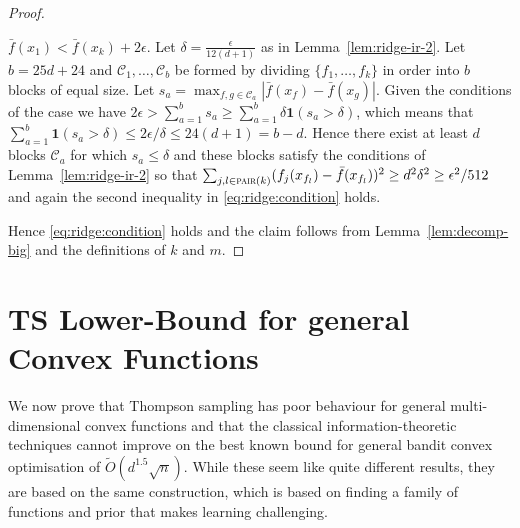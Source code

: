 \documentclass[letter, 12pt]{report}
\newcommand{\pair}{\operatorname{\textsc{pair}}}
\newcommand{\cC}{\mathcal C}
\newcommand{\sind}{\bm{1}}
\newcommand{\1}{\mathbf{1}}
\newcommand{\ts}{\textsc{TS}\xspace}
\theoremstyle{plain}
\theoremstyle{definition}
\theoremstyle{remark}
\begin{document}
\begin{proof}
\begin{enumcases}
        \item $\bar f(x_1) < \bar f(x_k) + 2\epsilon$. Let $\delta = \frac{\epsilon}{12(d+1)}$ as in Lemma~\ref{lem:ridge-ir-2}.
        Let $b = 25d + 24$ and $\cC_1,\ldots,\cC_b$ be formed by dividing $\{f_1,\ldots,f_k\}$ in order into $b$ blocks of equal size.
        Let $s_a = \max_{f,g \in \cC_a} |\bar f(x_f) - \bar f(x_g)|$.
        Given the conditions of the case we have $2\epsilon > \sum_{a=1}^b s_a \geq \sum_{a=1}^b \delta \sind(s_a > \delta)$,
        which means that $\sum_{a=1}^b \sind(s_a > \delta) \leq 2\epsilon / \delta \leq 24(d+1) = b - d$.
        Hence there exist at least $d$ blocks $\cC_a$ for which $s_a \leq \delta$ and these blocks satisfy the conditions of Lemma~\ref{lem:ridge-ir-2} so that
        $\sum_{j,l \in \pair(k)} (f_j(x_{f_l}) - \bar f(x_{f_l}))^2 \geq d^2 \delta^2 \geq \epsilon^2 / 512$ and again the
        second inequality in \cref{eq:ridge:condition} holds.
    \end{enumcases}
    Hence \cref{eq:ridge:condition} holds and the claim follows from Lemma~\ref{lem:decomp-big} and the definitions of $k$ and $m$.
\end{proof}

\chapter{\ts Lower-Bound for general Convex Functions}
\label{chp:ts-lower-proof}
We now prove that
Thompson sampling has poor behaviour for general multi-dimensional convex functions and
that the classical information-theoretic techniques cannot improve on the best known bound for general bandit convex optimisation
of $\tilde O(d^{1.5} \sqrt{n})$. While these seem like quite different results, they are based on the same construction, which is
based on finding a family of functions and prior that makes learning challenging.
\end{document}
